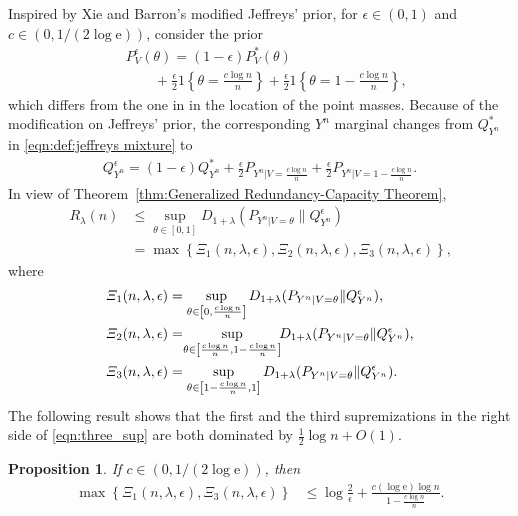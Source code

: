 \documentclass[journal, 10pt]{IEEEtran}
\newcommand{\rme}{\mathrm{e}}
\theoremstyle{plain}
\theoremstyle{plain}
\theoremstyle{plain}
\newtheorem{prop}{Proposition}%
\theoremstyle{plain}
\begin{document}
Inspired by Xie and Barron's \cite{XieBarron1997} modified Jeffreys' prior, for $\epsilon \in (0,1) $ and $c\in (0, 1/(2\log \rme)) $, consider the prior 
\begin{align}
&P_V^\epsilon(\theta)=(1-\epsilon) P^\ast _{V}(\theta)  \label{eqn:Mod_Jeff_1_dim} \\ 
&\qquad +\frac{\epsilon}{2} 1\left\{\theta=\frac{c\log n}{n}\right\}+\frac{\epsilon}{2} 1\left\{\theta=1- \frac{c\log n}{n}\right\}\text{,}  \nonumber
\end{align}
which differs from the one in \cite{XieBarron1997} in the location of the point masses. Because of the modification on Jeffreys' prior, the corresponding $Y^n$ marginal changes from $Q_{Y^n}^\ast $ in \eqref{eqn:def:jeffreys mixture} to
\begin{align}
Q^\epsilon _{Y^n}=(1-\epsilon) Q^\ast _{Y^n}+\frac{\epsilon}{2} P_{Y^n | V=\frac{c\log n}{n}}+\frac{\epsilon}{2} P_{Y^n | V=1-\frac{c\log n}{n}}\text{.} \label{eqn:mod_jeff_mix}
\end{align}
In view of Theorem~\ref{thm:Generalized Redundancy-Capacity Theorem},
\begin{align}
R_\lambda(n)
&\le
\sup_{\theta \in \left[ 0,1\right] }D_{1+\lambda }\left( P_{Y^n|V=\theta} \| Q_{Y^n}^{\epsilon}\right) \label{eqn:before three_sup} \\
&=
\max \left\{\Xi_1(n,\lambda, \epsilon), \Xi_2(n,\lambda, \epsilon), \Xi_3(n,\lambda, \epsilon)   \right\}\text{,} \label{eqn:three_sup}
\end{align}
where
\begin{align}   
\Xi_1(n,\lambda, \epsilon)&=
\sup _{\theta \in \left[ 0,\frac{c\log n}{n}\right] }  D_{1+\lambda } ( P_{Y^n|V=\theta} \| Q_{Y^n}^{\epsilon})\text{,} \label{eqn:def:Xi1} \\
\Xi_2(n,\lambda, \epsilon)
&=\hspace{-0.9mm} \sup _{\theta \in \left[\frac{c\log n}{n} ,1-\frac{c\log n}{n}\right] } \hspace{-1.1mm} D_{1+\lambda }( P_{Y^n|V=\theta} \| Q_{Y^n}^{\epsilon})\text{,} \label{eqn:def:Xi2} \\
\Xi_3(n,\lambda, \epsilon)&=
\sup_{\theta \in \left[ 1-\frac{c\log n}{n}, 1\right] }D_{1+\lambda }( P_{Y^n|V=\theta} \| Q_{Y^n}^{\epsilon})\text{.} \label{eqn:def:Xi3}
\end{align}
The following result shows that the first and the third supremizations in the right side of \eqref{eqn:three_sup} are both dominated by $\tfrac12 \log n + O(1)$. 
\begin{prop}\label{prop:achievability k=2 theta in face of simplex} 
If $c\in (0, 1/(2\log \rme) ) $, then
\begin{align} 
\max\left\{ 
\Xi_1(n,\lambda, \epsilon), \Xi_3(n,\lambda, \epsilon)
 \right\}
& \le
\log \frac{2}{\epsilon} +\frac{c(\log \rme)\log n }{1-\frac{c\log n}{n}}\text{.}
\end{align} 
\end{prop}
\end{document}
